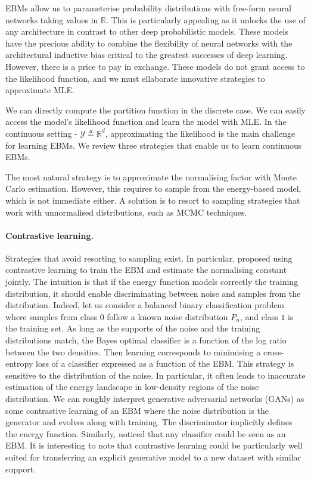 EBMs allow us to parameterise probability distributions with free-form neural networks taking values in $\mathbb{R}$. This is particularly appealing as it unlocks the use of any architecture in contrast to other deep probabilistic models. These models have the precious ability to combine the flexibility of neural networks with the architectural inductive bias critical to the greatest successes of deep learning. However, there is a price to pay in exchange. These models do not grant access to the likelihood function, and we must ellaborate innovative strategies to approximate MLE.

We can directly compute the partition function in the discrete case. We can easily access the model's likelihood function and learn the model with MLE. In the continuous setting - $\mathcal{Y} \triangleq \mathbb{R}^d$, approximating the likelihood is the main challenge for learning EBMs. We review three strategies that enable us to learn continuous EBMs.

The most natural strategy is to approximate the normalising factor with Monte Carlo estimation. However, this requires to sample from the energy-based model, which is not immediate either. A solution is to resort to sampling strategies that work with unnormalised distributions, such as MCMC techniques.

\paragraph{Contrastive learning.}
Strategies that avoid resorting to sampling exist. In particular, \citet{gutmann2012noise} proposed using contrastive learning to train the EBM and estimate the normalising constant jointly. The intuition is that if the energy function models correctly the training distribution, it should enable discriminating between noise and samples from the distribution. Indeed, let us consider a balanced binary classification problem where samples from class $0$ follow a known noise distribution $P_n$, and class $1$ is the training set. As long as the supports of the noise and the training distributions match, the Bayes optimal classifier is a function of the log ratio between the two densities. Then learning corresponds to minimising a cross-entropy loss of a classifier expressed as a function of the EBM. This strategy is sensitive to the distribution of the noise. In particular, it often leads to inaccurate estimation of the energy landscape in low-density regions of the noise distribution. We can roughly interpret generative adversarial networks (GANs) as some contrastive learning of an EBM where the noise distribution is the generator and evolves along with training. The discriminator implicitly defines the energy function. Similarly, \citet{grathwohl2019your} noticed that any classifier could be seen as an EBM. It is interesting to note that contrastive learning could be particularly well suited for transferring an explicit generative model to a new dataset with similar support.

